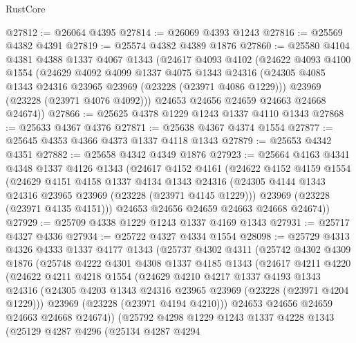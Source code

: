 \begin{lexlean}{RustCore}
\begin{coremodule}
@27812 := @26064 @4395
@27814 := @26069 @4393 @1243
@27816 := @25569 @4382 @4391
@27819 := @25574 @4382 @4389 @1876
@27860 := @25580
    @4104
    @4381
    @4388
    @1337
    @4067
    @1343
    (@24617
      @4093
      @4102
      (@24622
        @4093
        @4100
        @1554
        (@24629
          @4092
          @4099
          @1337
          @4075
          @1343
          @24316
          (@24305 @4085 @1343 @24316 @23965 @23969 (@23228 (@23971 @4086 @1229)))
          @23969
          (@23228 (@23971 @4076 @4092)))
        @24653
        @24656
        @24659
        @24663
        @24668
        @24674))
@27866 := @25625 @4378 @1229 @1243 @1337 @4110 @1343
@27868 := @25633 @4367 @4376
@27871 := @25638 @4367 @4374 @1554
@27877 := @25645 @4353 @4366 @4373 @1337 @4118 @1343
@27879 := @25653 @4342 @4351
@27882 := @25658 @4342 @4349 @1876
@27923 := @25664
    @4163
    @4341
    @4348
    @1337
    @4126
    @1343
    (@24617
      @4152
      @4161
      (@24622
        @4152
        @4159
        @1554
        (@24629
          @4151
          @4158
          @1337
          @4134
          @1343
          @24316
          (@24305 @4144 @1343 @24316 @23965 @23969 (@23228 (@23971 @4145 @1229)))
          @23969
          (@23228 (@23971 @4135 @4151)))
        @24653
        @24656
        @24659
        @24663
        @24668
        @24674))
@27929 := @25709 @4338 @1229 @1243 @1337 @4169 @1343
@27931 := @25717 @4327 @4336
@27934 := @25722 @4327 @4334 @1554
@28098 := @25729
    @4313
    @4326
    @4333
    @1337
    @4177
    @1343
    (@25737
      @4302
      @4311
      (@25742
        @4302
        @4309
        @1876
        (@25748
          @4222
          @4301
          @4308
          @1337
          @4185
          @1343
          (@24617
            @4211
            @4220
            (@24622
              @4211
              @4218
              @1554
              (@24629
                @4210
                @4217
                @1337
                @4193
                @1343
                @24316
                (@24305 @4203 @1343 @24316 @23965 @23969 (@23228 (@23971 @4204 @1229)))
                @23969
                (@23228 (@23971 @4194 @4210)))
              @24653
              @24656
              @24659
              @24663
              @24668
              @24674))
          (@25792
            @4298
            @1229
            @1243
            @1337
            @4228
            @1343
            (@25129
              @4287
              @4296
              (@25134
                @4287
                @4294

\end{coremodule}
\end{lexlean}
